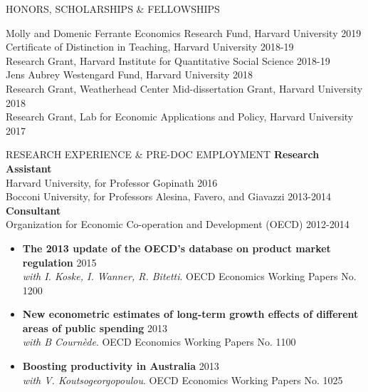 \documentclass{resume} %
\begin{document}
\begin{rSection}{HONORS, SCHOLARSHIPS \& FELLOWSHIPS} 

Molly and Domenic Ferrante Economics Research Fund, Harvard University \hfill 2019 \\
Certificate of Distinction in Teaching, Harvard University \hfill 2018-19 \\
Research Grant, Harvard Institute for Quantitative Social Science \hfill 2018-19 \\
Jens Aubrey Westengard Fund, Harvard University \hfill 2018 \\
Research Grant, Weatherhead Center Mid-dissertation Grant, Harvard University \hfill 2018 \\
Research Grant, Lab for Economic Applications and Policy, Harvard University \hfill 2017 \\

\end{rSection}


\begin{rSection}{RESEARCH EXPERIENCE \& PRE-DOC EMPLOYMENT}
	\textbf{Research Assistant}\\
	Harvard University, for Professor Gopinath \hfill 2016 \\
	Bocconi University, for Professors Alesina, Favero, and Giavazzi \hfill 2013-2014 \\
	
	\textbf{Consultant}\\
	Organization for Economic Co-operation and Development (OECD) \hfill 2012-2014 \\
	\renewcommand\labelitemi{$\cdot$}
	\begin{itemize}[leftmargin=*]
		\vspace{-1.5em}
		\setlength\itemsep{-.5em}
		\item \textbf{The 2013 update of the OECD's database on product market regulation} \hfill 2015 \\ \textit{with I. Koske, I. Wanner, R. Bitetti}. OECD Economics Working Papers No. 1200
		\item \textbf{New econometric estimates of long-term growth effects of different areas of public spending} \hfill 2013 \\ \textit{with B Cournède}. OECD Economics Working Papers No. 1100
		\item \textbf{Boosting productivity in Australia} \hfill 2013 \\ \textit{with V. Koutsogeorgopoulou}. OECD Economics Working Papers No. 1025
	\end{itemize}
	
\end{rSection}
\end{document}
